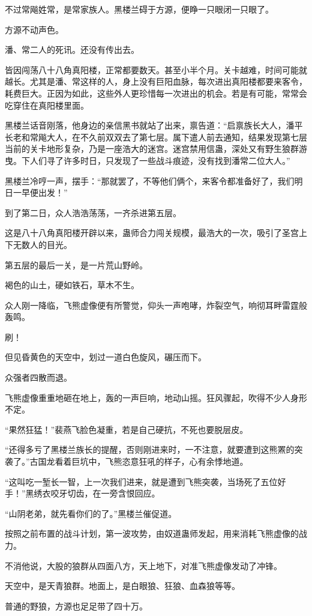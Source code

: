 \begin{this_body}
不过常飚姓常，是常家族人。黑楼兰碍于方源，便睁一只眼闭一只眼了。

方源不动声色。

潘、常二人的死讯。还没有传出去。

皆因闯荡八十八角真阳楼，正常都要数天。甚至小半个月。关卡越难，时间可能就越长。尤其是潘、常这样的人，身上没有巨阳血脉，每次进出真阳楼都要来客令，耗费巨大。正因为如此，这些外人更珍惜每一次进出的机会。若是有可能，常常会吃穿住在真阳楼里面。

黑楼兰话音刚落，他身边的亲信黑书就站了出来，禀告道：“启禀族长大人，潘平长老和常飚大人，在不久前双双去了第七层。属下遣人前去通知，结果发现第七层当前的关卡地形复杂，乃是一座浩大的迷宫。迷宫禁用信蛊，深处又有野生狼群游曳。下人们寻了许多时日，只发现了一些战斗痕迹，没有找到潘常二位大人。”

黑楼兰冷哼一声，摆手：“那就罢了，不等他们俩个，来客令都准备好了，我们明日一早便出发！”

到了第二日，众人浩浩荡荡，一齐杀进第五层。

这是八十八角真阳楼开辟以来，蛊师合力闯关规模，最浩大的一次，吸引了圣宫上下无数人的目光。

第五层的最后一关，是一片荒山野岭。

褐色的山土，硬如铁石，草木不生。

众人刚一降临，飞熊虚像便有所警觉，仰头一声咆哮，炸裂空气，响彻耳畔雷霆般轰鸣。

刷！

但见昏黄色的天空中，划过一道白色旋风，碾压而下。

众强者四散而退。

飞熊虚像重重地砸在地上，轰的一声巨响，地动山摇。狂风骤起，吹得不少人身形不定。

“果然狂猛！”裴燕飞脸色凝重，若是自己硬抗，不死也要脱层皮。

“还得多亏了黑楼兰族长的提醒，否则刚进来时，一不注意，就要遭到这熊罴的突袭了。”古国龙看着巨坑中，飞熊恣意狂吼的样子，心有余悸地道。

“这叫吃一堑长一智，上一次我们进来，就是遭到飞熊突袭，当场死了五位好手！”黑绣衣咬牙切齿，在一旁含恨回应。

“山阴老弟，就先看你们的了。”黑楼兰催促道。

按照之前布置的战斗计划，第一波攻势，由奴道蛊师发起，用来消耗飞熊虚像的战力。

不消他说，大股的狼群从四面八方，天上地下，对准飞熊虚像发动了冲锋。

天空中，是天青狼群。地面上，是白眼狼、狂狼、血森狼等等。

普通的野狼，方源也足足带了四十万。


\end{this_body}
